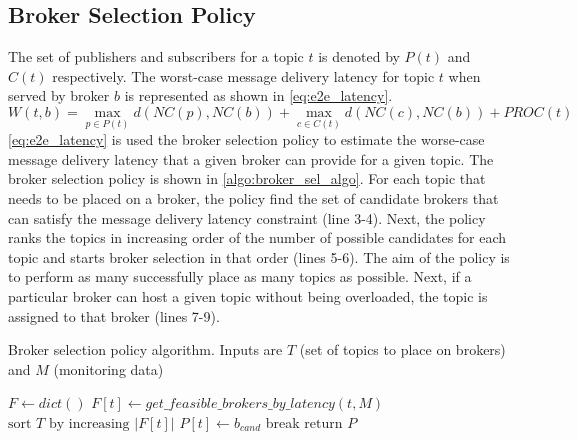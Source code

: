 \subsection{Broker Selection Policy}
The set of publishers and subscribers for a topic $t$ is denoted by $P \left( t \right)$ and $C \left( t \right)$ respectively. The worst-case message delivery latency for topic $t$ when served by broker $b$ is represented as shown in \cref{eq:e2e_latency}.
\begin{equation}
W\left( t, b \right) = \max\limits_{p \in P\left( t \right)} d \left( NC \left( p\right), NC \left( b\right) \right) + \max\limits_{c \in C\left( t \right)} d \left( NC \left( c\right), NC \left( b\right)\right) + PROC \left( t \right)
\label{eq:e2e_latency}
\end{equation}
\cref{eq:e2e_latency} is used the broker selection policy to estimate the worse-case message delivery latency that a given broker can provide for a given topic. The broker selection policy is shown in \cref{algo:broker_sel_algo}. For each topic that needs to be placed on a broker, the policy find the set of candidate brokers that can satisfy the message delivery latency constraint (line 3-4). Next, the policy ranks the topics in increasing order of the number of possible candidates for each topic and starts broker selection in that order (lines 5-6). The aim of the policy is to perform as many successfully place as many topics as possible. Next, if a particular broker can host a given topic without being overloaded, the topic is assigned to that broker (lines 7-9). 
\begin{algorithm}
\caption{Broker selection policy algorithm. Inputs are $T$ (set of topics to place on brokers) and $M$ (monitoring data)}\label{algo:broker_sel_algo}
\begin{algorithmic}[1]
\State $F \gets dict\left(\right)$
    \State $F \left[ t \right] \gets get\_feasible\_brokers\_by\_latency \left( t , M\right)$
\EndFor
\State $\text{sort } T \text{ by increasing } |F \left[ t \right]|$
         
            \State $P \left[ t \right] \gets b_{cand}$
            \State break
        \EndIf
    \EndFor
\EndFor
\State $\text{return } P$
\EndProcedure
\end{algorithmic}
\end{algorithm}

